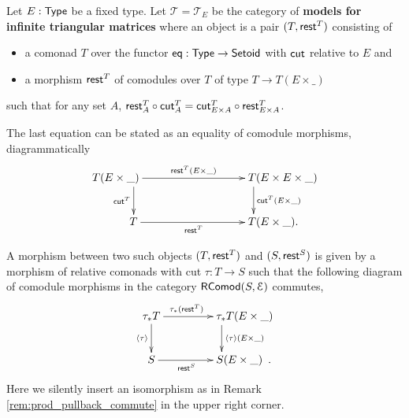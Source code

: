 \documentclass[a4paper,USenglish]{lipics}
\newcommand{\fat}[1]{\textbf{#1}}
\begin{document}
\begin{definition}
\label{def:cat_tri}
   Let $E:\mathsf{Type}$ be a fixed type.
   Let $\mathcal{T} = \mathcal{T}_E$ be the category of \fat{models for infinite triangular matrices} where an object is a pair $(T,\mathsf{rest}^T)$ consisting of
   \begin{itemize}
    \item a comonad $T$ over the functor $\mathsf{eq}:\mathsf{Type}\to\mathsf{Setoid}$ with $\mathsf{cut}$ relative to $E$ and
    \item a morphism $\mathsf{rest}^T$ of comodules over $T$ of type $T \to T(E\times \_)$
   \end{itemize}
   such that for any set $A$,
    $ {\mathsf{rest}^T_A} \circ {\ensuremath{\mathsf{cut}}^T_A} = {\mathsf{cut}^T_{E\times A}} \circ {\ensuremath{\mathsf{rest}}^T_{E\times A}}$.
    
   The last equation can be stated as an equality of comodule morphisms, diagrammatically
   \[
    \begin{xy}
     \xymatrix@C=5em{
                    **[l]  T(E\times \_) \ar[d]_{\cut^T} \ar[r]^-{\tail^T(E\times \_ )} & **[r] T(E \times E \times \_)  \ar[d]^{\cut^T(E\times\_)} \\
                     **[l] T \ar[r]_{\tail^T} & **[r] T (E\times \_).
     }
    \end{xy}
   \]

  
   \noindent
   A morphism between two such objects $(T,\mathsf{rest}^T)$ and $(S,\mathsf{rest}^S)$
   is given by a morphism of relative comonads with cut $\tau : T \to S$ such that
   the following diagram of comodule morphisms in the category $\mathsf{RComod}(S,\mathcal{E})$ commutes,
   \begin{equation} \begin{xy}
       \xymatrix{   \tau_*T  \ar[r]^{\tau_*(\tail^T)} \ar[d]_{\induced{\tau}}  &  **[r] \tau_*T (E\times \_ )\ar[d]^{\induced{\tau}(E\times \_)} \\
                    S  \ar[r]_{\tail^S}  &  **[r] S (E\times \_ ) \enspace .
        }
      \end{xy}
      \label{eq:tri_model}
   \end{equation}
   Here we silently insert an isomorphism as in Remark \ref{rem:prod_pullback_commute} in the upper right corner.
\end{definition}   
\end{document}

